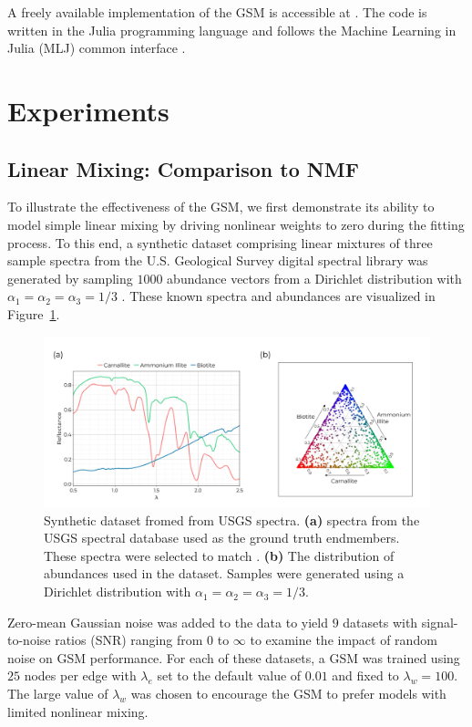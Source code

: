 \documentclass[remotesensing,article,submit,pdftex,moreauthors]{Definitions/mdpi}
\begin{document}
A freely available implementation of the GSM is accessible at \cite{gtm-code}. The code is written in the Julia programming language and follows the Machine Learning in Julia (MLJ) common interface \cite{bezanson2012julia, blaom2020mlj}.

\section{Experiments}\label{sec:experiments}

\subsection{Linear Mixing: Comparison to NMF}

To illustrate the effectiveness of the GSM, we first demonstrate its ability to model simple linear mixing by driving nonlinear weights to zero during the fitting process. To this end, a synthetic dataset comprising linear mixtures of three sample spectra from the U.S. Geological Survey digital spectral library was generated by sampling $1000$ abundance vectors from a Dirichlet distribution with $\alpha_1=\alpha_2=\alpha_3=1/3$ \cite{usgs-spectra}. These known spectra and abundances are visualized in Figure~\ref{fig:usgs-data}.

\begin{figure}[H]
\includegraphics[width=\columnwidth]{methods/usgs/usgs-dataset.pdf}
\caption{Synthetic dataset fromed from USGS spectra. \textbf{(a)} spectra from the USGS spectral database used as the ground truth endmembers. These spectra were selected to match \cite{vca-orig}. \textbf{(b)} The distribution of abundances used in the dataset. Samples were generated using a Dirichlet distribution with $\alpha_1=\alpha_2=\alpha_3=1/3$.}
\label{fig:usgs-data}
\end{figure}  

Zero-mean Gaussian noise was added to the data to yield $9$ datasets with signal-to-noise ratios (SNR) ranging from $0$ to $\infty$ to examine the impact of random noise on GSM performance. For each of these datasets, a GSM was trained using $25$ nodes per edge with $\lambda_e$ set to the default value of $0.01$ and fixed to $\lambda_w = 100$. The large value of $\lambda_w$ was chosen to encourage the GSM to prefer models with limited nonlinear mixing.
\end{document}

